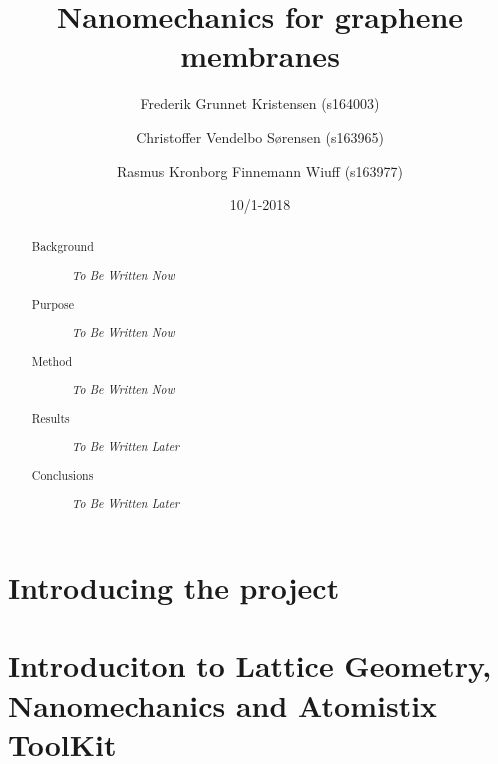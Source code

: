 \documentclass[aps, prl, reprint, a4paper, english, 12pt, twocolumn]{revtex4}
\begin{document}
\begin{abstract}
 \begin{description}
  \item[Background]
        \textit{To Be Written Now}
  \item[Purpose]
        \textit{To Be Written Now}
  \item[Method]
        \textit{To Be Written Now}
  \item[Results]
        \textit{To Be Written Later}
  \item[Conclusions]
        \textit{To Be Written Later}
 \end{description}
\end{abstract}

\title{Nanomechanics for graphene membranes}
\date{10/1-2018}
\author{Frederik Grunnet Kristensen (s164003)}
\author{Christoffer Vendelbo Sørensen (s163965)}
\author{Rasmus Kronborg Finnemann Wiuff (s163977)}

\maketitle


\tableofcontents
\thispagestyle{empty}
\newpage
\setcounter{page}{1}

\section{Introducing the project}

\section{Introduciton to Lattice Geometry, Nanomechanics and Atomistix ToolKit}





\newpage




\newpage
\listoffigures
\listoftables
\listoflistings
\onecolumngrid
\newpage

\end{document}
